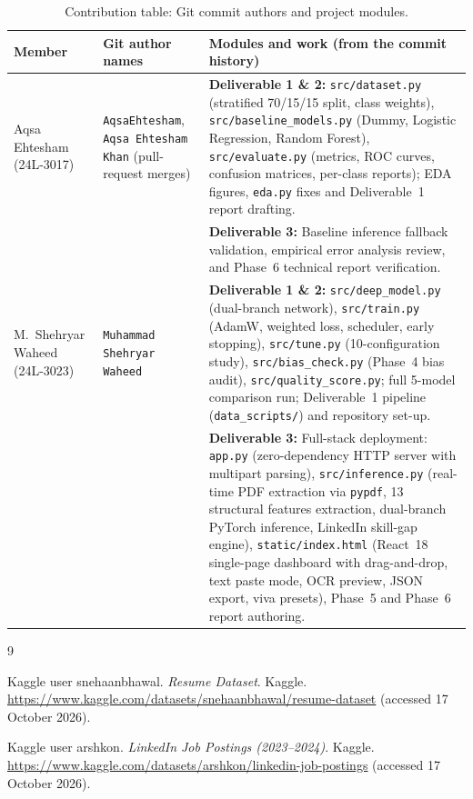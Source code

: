 \documentclass[11pt,a4paper]{article}
\begin{document}
\begin{table}[htbp]
  \centering
  \footnotesize
  \begin{tabularx}{\textwidth}{@{}>{\raggedright\arraybackslash}p{2.6cm}>{\raggedright\arraybackslash}p{2.8cm}>{\raggedright\arraybackslash}X@{}}
    \toprule
    Member & Git author names & Modules and work (from the commit history) \\
    \midrule
    Aqsa Ehtesham (24L-3017) &
    \texttt{AqsaEhtesham}, \texttt{Aqsa Ehtesham Khan} (pull-request merges) &
    \textbf{Deliverable 1 \& 2:} \texttt{src/dataset.py} (stratified 70/15/15
    split, class weights), \texttt{src/baseline\_models.py} (Dummy, Logistic
    Regression, Random Forest), \texttt{src/evaluate.py} (metrics, ROC curves,
    confusion matrices, per-class reports); EDA figures, \texttt{eda.py} fixes
    and Deliverable~1 report drafting.\\
    \addlinespace
    & & \textbf{Deliverable 3:} Baseline inference fallback validation, empirical
    error analysis review, and Phase~6 technical report verification. \\
    \addlinespace
    M.\ Shehryar Waheed (24L-3023) &
    \texttt{Muhammad Shehryar Waheed} &
    \textbf{Deliverable 1 \& 2:} \texttt{src/deep\_model.py} (dual-branch network),
    \texttt{src/train.py} (AdamW, weighted loss, scheduler, early stopping),
    \texttt{src/tune.py} (10-configuration study), \texttt{src/bias\_check.py}
    (Phase~4 bias audit), \texttt{src/quality\_score.py}; full 5-model comparison
    run; Deliverable~1 pipeline (\texttt{data\_scripts/}) and repository set-up.\\
    \addlinespace
    & & \textbf{Deliverable 3:} Full-stack deployment: \texttt{app.py}
    (zero-dependency HTTP server with multipart parsing), \texttt{src/inference.py}
    (real-time PDF extraction via \texttt{pypdf}, 13 structural features extraction,
    dual-branch PyTorch inference, LinkedIn skill-gap engine), \texttt{static/index.html}
    (React~18 single-page dashboard with drag-and-drop, text paste mode, OCR preview,
    JSON export, viva presets), Phase~5 and Phase~6 report authoring. \\
    \bottomrule
  \end{tabularx}
  \caption{Contribution table: Git commit authors and project modules.}
  \label{tab:contrib}
\end{table}

\FloatBarrier

\begin{thebibliography}{9}

Kaggle user snehaanbhawal. \emph{Resume Dataset}. Kaggle.
\url{https://www.kaggle.com/datasets/snehaanbhawal/resume-dataset}
(accessed 17 October 2026).

Kaggle user arshkon. \emph{LinkedIn Job Postings (2023--2024)}. Kaggle.
\url{https://www.kaggle.com/datasets/arshkon/linkedin-job-postings}
(accessed 17 October 2026).

\end{thebibliography}
\end{document}
